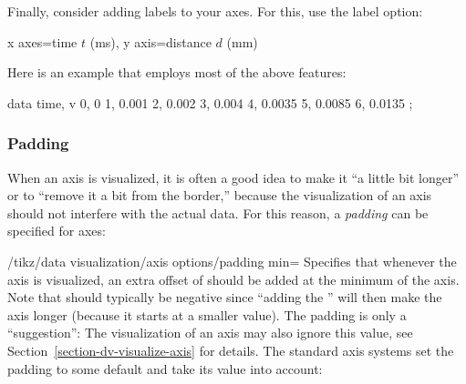 Finally, consider adding labels to your axes. For this, use the label
option:
\begin{codeexample}
x axes={time $t$ (ms)}, y axis={distance $d$ (mm)}  
\end{codeexample}

Here is an example that employs most of the above features:

\begin{codeexample}[]
\tikz \datavisualization
  [scientific clean axes,
   x axis={ attribute=time, ticks={tick unit=$\mathrm{ms}$},          label={elapsed time}},
   y axis={ attribute=v,    ticks={tick unit=$\mathrm{m}/\mathrm s$}, label={speed of disc}},
   all axes=grid,
   visualize as line]
  data {
    time, v
    0, 0
    1, 0.001
    2, 0.002
    3, 0.004
    4, 0.0035
    5, 0.0085
    6, 0.0135
  };
\end{codeexample}


\subsubsection{Padding}

When an axis is visualized, it is often a good idea to make it ``a
little bit longer'' or to ``remove it a bit from the border,'' because
the visualization of an axis should not interfere with the actual
data. For this reason, a \emph{padding} can be specified for axes:

\begin{key}{/tikz/data visualization/axis options/padding min=}
  Specifies that whenever the axis is visualized, an extra offset of
   should be added at the minimum of the
  axis. Note that  should typically be negative since
  ``adding the '' will then make the axis longer
  (because it starts at a smaller value). The padding is only a
  ``suggestion'': The visualization of an axis may also ignore this value, see
  Section~\ref{section-dv-visualize-axis} for details. The standard
  axis systems set the padding to some default and take its value into
  account: 
\begin{codeexample}[]
\end{codeexample}
\end{key}

